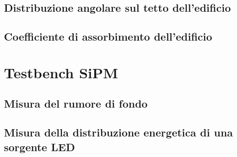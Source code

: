 \documentclass[11pt]{article} %
\begin{document}
\subsection{Distribuzione angolare sul tetto dell'edificio}
\subsection{Coefficiente di assorbimento dell'edificio}
\section{Testbench SiPM} 
\subsection{Misura del rumore di fondo}
\subsection{Misura della distribuzione energetica di una sorgente LED}
\end{document}
